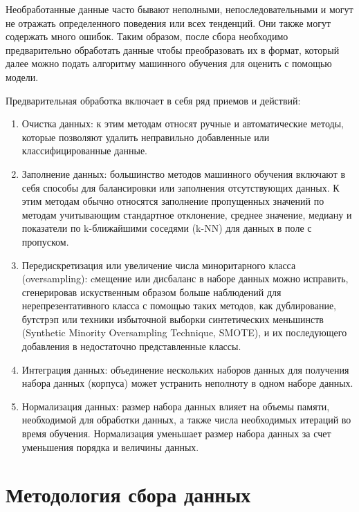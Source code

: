 \documentclass[12pt,a4paper, oneside]{extreport}
\begin{document}
Необработанные данные часто бывают неполными, непоследовательными и могут не отражать  определенного поведения или всех тенденций. Они также могут содержать много ошибок. Таким образом, после сбора необходимо предварительно обработать данные чтобы преобразовать их в формат, который далее можно подать алгоритму машинного обучения для оценить с помощью модели.

Предварительная обработка включает в себя ряд приемов и действий:

\begin{enumerate}
	\item Очистка данных: к этим методам относят ручные и автоматические методы, которые позволяют удалить  неправильно добавленные или классифицированные данные.
	\item  Заполнение  данных: большинство методов машинного обучения включают в себя способы для балансировки или заполнения отсутствующих данных. К этим методам обычно относятся заполнение пропущенных значений по методам учитывающим стандартное  отклонение, среднее значение, медиану  и показатели по  k-ближайшими соседями (k-NN) для данных в поле с пропуском.
	\item Передискретизация или увеличение числа  миноритарного класса (oversampling): cмещение или дисбаланс в наборе данных можно исправить, сгенерировав искуственным образом больше наблюдений  для нерепрезентативного класса с помощью таких методов, как дублирование, бутстрэп  или техники избыточной выборки синтетических меньшинств  (Synthetic Minority Oversampling Technique, SMOTE), и их последующего  добавления в недостаточно представленные классы.
	\item  Интеграция данных: объединение нескольких наборов данных для получения набора данных (корпуса)  может устранить неполноту в одном наборе данных.
	\item  Нормализация данных: размер набора данных влияет на  объемы памяти, необходимой для  обработки данных, а также числа необходимых итераций во время обучения. Нормализация уменьшает размер набора данных за счет уменьшения порядка и величины данных.
	
\end{enumerate}





\section{Методология сбора данных}
\end{document}
